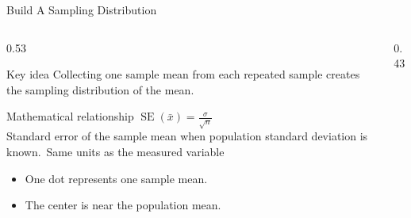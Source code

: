 \documentclass[aspectratio=169]{beamer}
\begin{document}
\begin{frame}{Build A Sampling Distribution}
\begin{columns}[T]
\begin{column}{0.53\textwidth}
\begin{alertblock}{Key idea}
\small Collecting one sample mean from each repeated sample creates the sampling distribution of the mean.
\end{alertblock}

\begin{block}{Mathematical relationship}
\centering\Large $\operatorname{SE}(\bar{x})=\frac{\sigma}{\sqrt{n}}$\\[0.12cm]
\small Standard error of the sample mean when population standard deviation is known.\ Same units as the measured variable
\end{block}

\begin{itemize}
\small
\item One dot represents one sample mean.
\item The center is near the population mean.
\end{itemize}
\end{column}
\begin{column}{0.43\textwidth}
\begin{center}\end{center}
\end{column}
\end{columns}

\end{frame}
\end{document}
